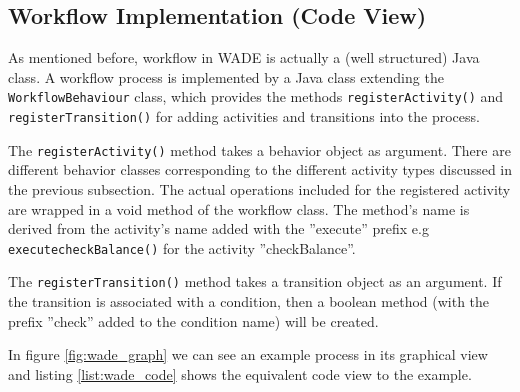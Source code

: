 \subsection{Workflow Implementation (Code View)}
As mentioned before, workflow in WADE is actually a (well structured) Java class. A workflow process is implemented by a Java class extending the \verb|WorkflowBehaviour| class, which provides the methods \verb|registerActivity()| and \verb|registerTransition()| for adding activities and transitions into the process. 

The \verb|registerActivity()| method takes a behavior object as argument. There are different behavior classes corresponding to the different activity types discussed in the previous subsection. The actual operations included for the registered activity are wrapped in a void method of the workflow class. The method's name is derived from the activity's name added with the ''execute'' prefix e.g \verb|executecheckBalance()| for the activity ''checkBalance''.  

The \verb|registerTransition()| method takes a transition object as an argument. If the transition is associated with a condition, then a boolean method (with the prefix ''check'' added to the condition name) will be created.

In figure \ref{fig:wade_graph} we can see an example process in its graphical view and listing \ref{list:wade_code} shows the equivalent code view to the example. 

